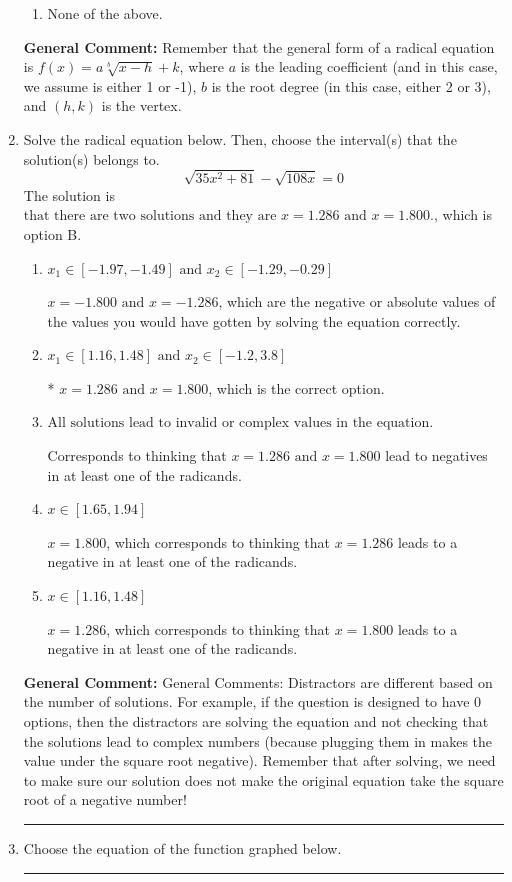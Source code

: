 \documentclass{extbook}[14pt]
\newcommand{\litem}[1]{\item #1

\rule{\textwidth}{0.4pt}}
\begin{document}
\begin{enumerate}
{\begin{enumerate}[label=\Alph*.]
\begin{multicols}{2}
\end{multicols}\item None of the above.\end{enumerate}
\textbf{General Comment:} Remember that the general form of a radical equation is $ f(x) = a \sqrt[b]{x - h} + k $, where $a$ is the leading coefficient (and in this case, we assume is either 1 or -1), $b$ is the root degree (in this case, either 2 or 3), and $(h, k)$ is the vertex.
}
\litem{
Solve the radical equation below. Then, choose the interval(s) that the solution(s) belongs to.
\[ \sqrt{35 x^2 + 81} - \sqrt{108 x} = 0 \]The solution is \( \text{that there are two solutions and they are } x = 1.286 \text{ and } x = 1.800. \), which is option B.\begin{enumerate}[label=\Alph*.]
\item \( x_1 \in [-1.97, -1.49] \text{ and } x_2 \in [-1.29,-0.29] \)

$x = -1.800 \text{ and } x = -1.286$, which are the negative or absolute values of the values you would have gotten by solving the equation correctly.
\item \( x_1 \in [1.16, 1.48] \text{ and } x_2 \in [-1.2,3.8] \)

* $x = 1.286 \text{ and } x = 1.800$, which is the correct option.
\item \( \text{All solutions lead to invalid or complex values in the equation.} \)

Corresponds to thinking that $x = 1.286 \text{ and } x = 1.800$ lead to negatives in at least one of the radicands.
\item \( x \in [1.65,1.94] \)

$x = 1.800$, which corresponds to thinking that $x = 1.286$ leads to a negative in at least one of the radicands.
\item \( x \in [1.16,1.48] \)

$x = 1.286$, which corresponds to thinking that $x = 1.800$ leads to a negative in at least one of the radicands.
\end{enumerate}

\textbf{General Comment:} General Comments: Distractors are different based on the number of solutions. For example, if the question is designed to have 0 options, then the distractors are solving the equation and not checking that the solutions lead to complex numbers (because plugging them in makes the value under the square root negative). Remember that after solving, we need to make sure our solution does not make the original equation take the square root of a negative number!
}
\litem{
Choose the equation of the function graphed below.

}
\end{enumerate}
\end{document}
